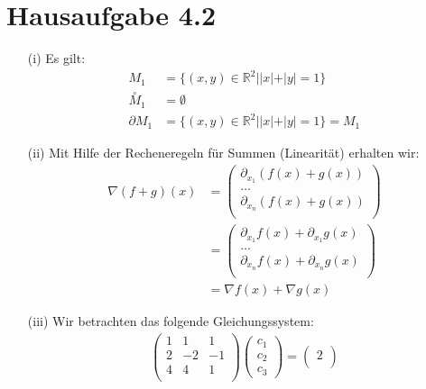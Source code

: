 \documentclass[11pt,a4paper]{scrartcl} %
\newcommand{\R}{\mathbb{R}}
\begin{document}
\section{Hausaufgabe 4.2}
\begin{itemize}
\item[(i)] Es gilt:
\begin{align*}
M_1 &= \{ ( x , y ) \in \R^2 \mid \vert x \vert + \vert y \vert = 1 \} \\
\overset{\circ} M_1 &= \emptyset \\
\partial M_1 &= \{ ( x , y ) \in \R^2 \mid \vert x \vert + \vert y \vert = 1 \} = M_1
\end{align*}
\item[(ii)] Mit Hilfe der Recheneregeln für Summen (Linearität) erhalten wir: 
\begin{align*}
\nabla (f + g)(x) &= 
\begin{pmatrix}
\partial_{x_1} (f(x) + g(x)) \\
\ldots \\
\partial_{x_n} (f(x) + g(x)) \\
\end{pmatrix} \\
&= \begin{pmatrix}
\partial_{x_1}f(x) + \partial_{x_1} g(x) \\
\ldots \\
\partial_{x_n}f(x) + \partial_{x_n} g(x)  \\
\end{pmatrix} \\
&= \nabla f(x) + \nabla g(x)
\end{align*}
\item[(iii)] Wir betrachten das folgende Gleichungssystem: 
\begin{align*}
\begin{pmatrix}
1 & 1 & 1 \\
2 & -2 & -1 \\
4 & 4 & 1 \\
\end{pmatrix}
\begin{pmatrix}
c_1 \\
c_2 \\
c_3 
\end{pmatrix}
= 
\begin{pmatrix}
2 \\

\end{pmatrix}
\end{align*}
\end{itemize}
\end{document}
